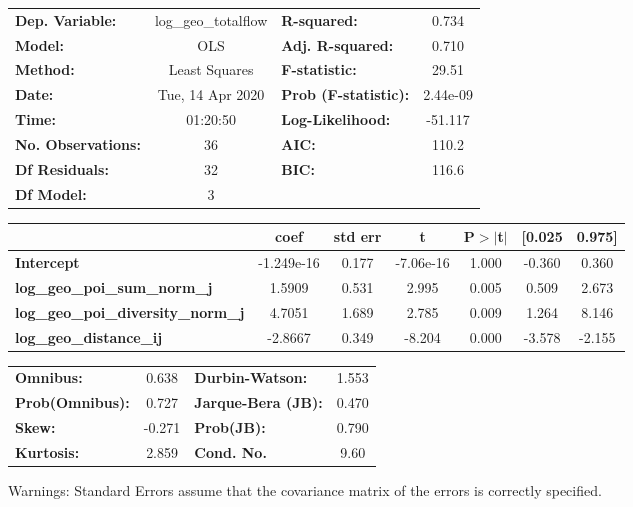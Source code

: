 \begin{center}
\begin{tabular}{lclc}
\toprule
\textbf{Dep. Variable:}                    & log\_geo\_totalflow & \textbf{  R-squared:         } &     0.734   \\
\textbf{Model:}                            &         OLS         & \textbf{  Adj. R-squared:    } &     0.710   \\
\textbf{Method:}                           &    Least Squares    & \textbf{  F-statistic:       } &     29.51   \\
\textbf{Date:}                             &   Tue, 14 Apr 2020  & \textbf{  Prob (F-statistic):} &  2.44e-09   \\
\textbf{Time:}                             &       01:20:50      & \textbf{  Log-Likelihood:    } &   -51.117   \\
\textbf{No. Observations:}                 &            36       & \textbf{  AIC:               } &     110.2   \\
\textbf{Df Residuals:}                     &            32       & \textbf{  BIC:               } &     116.6   \\
\textbf{Df Model:}                         &             3       & \textbf{                     } &             \\
\bottomrule
\end{tabular}
\begin{tabular}{lcccccc}
                                           & \textbf{coef} & \textbf{std err} & \textbf{t} & \textbf{P$> |$t$|$} & \textbf{[0.025} & \textbf{0.975]}  \\
\midrule
\textbf{Intercept}                         &   -1.249e-16  &        0.177     & -7.06e-16  &         1.000        &       -0.360    &        0.360     \\
\textbf{log\_geo\_poi\_sum\_norm\_j}       &       1.5909  &        0.531     &     2.995  &         0.005        &        0.509    &        2.673     \\
\textbf{log\_geo\_poi\_diversity\_norm\_j} &       4.7051  &        1.689     &     2.785  &         0.009        &        1.264    &        8.146     \\
\textbf{log\_geo\_distance\_ij}            &      -2.8667  &        0.349     &    -8.204  &         0.000        &       -3.578    &       -2.155     \\
\bottomrule
\end{tabular}
\begin{tabular}{lclc}
\textbf{Omnibus:}       &  0.638 & \textbf{  Durbin-Watson:     } &    1.553  \\
\textbf{Prob(Omnibus):} &  0.727 & \textbf{  Jarque-Bera (JB):  } &    0.470  \\
\textbf{Skew:}          & -0.271 & \textbf{  Prob(JB):          } &    0.790  \\
\textbf{Kurtosis:}      &  2.859 & \textbf{  Cond. No.          } &     9.60  \\
\bottomrule
\end{tabular}
\end{center}

Warnings: \newline
 [1] Standard Errors assume that the covariance matrix of the errors is correctly specified.
